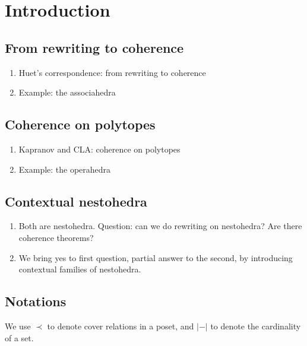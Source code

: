 
\section*{Introduction} 
\label{s:introduction}

\subsection*{From rewriting to coherence}

\begin{enumerate}
    \item Huet's correspondence: from rewriting to coherence 
    \item Example: the associahedra
\end{enumerate}

\subsection*{Coherence on polytopes}

\begin{enumerate}
    \item Kapranov and CLA: coherence on polytopes
    \item Example: the operahedra
\end{enumerate}

\subsection*{Contextual nestohedra}

\begin{enumerate}
    \item Both are nestohedra. Question: can we do rewriting on nestohedra? Are there coherence theorems?
    \item We bring yes to first question, partial answer to the second, by introducing contextual families of nestohedra.
\end{enumerate}

\subsection*{Notations}

We use $\prec$ to denote cover relations in a poset, and $|-|$ to denote the cardinality of a set.